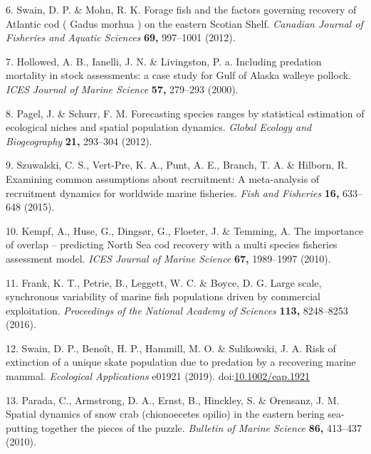 \documentclass[11pt,]{article}
\begin{document}
\leavevmode\hypertarget{ref-Swain2012}{}%
6. Swain, D. P. \& Mohn, R. K. Forage fish and the factors governing recovery of Atlantic cod ( Gadus morhua ) on the eastern Scotian Shelf. \emph{Canadian Journal of Fisheries and Aquatic Sciences} \textbf{69,} 997--1001 (2012).

\leavevmode\hypertarget{ref-Hollowed2000a}{}%
7. Hollowed, A. B., Ianelli, J. N. \& Livingston, P. a. Including predation mortality in stock assessments: a case study for Gulf of Alaska walleye pollock. \emph{ICES Journal of Marine Science} \textbf{57,} 279--293 (2000).

\leavevmode\hypertarget{ref-Pagel2012}{}%
8. Pagel, J. \& Schurr, F. M. Forecasting species ranges by statistical estimation of ecological niches and spatial population dynamics. \emph{Global Ecology and Biogeography} \textbf{21,} 293--304 (2012).

\leavevmode\hypertarget{ref-Szuwalski2015}{}%
9. Szuwalski, C. S., Vert-Pre, K. A., Punt, A. E., Branch, T. A. \& Hilborn, R. Examining common assumptions about recruitment: A meta-analysis of recruitment dynamics for worldwide marine fisheries. \emph{Fish and Fisheries} \textbf{16,} 633--648 (2015).

\leavevmode\hypertarget{ref-Kempf2010}{}%
10. Kempf, A., Huse, G., Dingsør, G., Floeter, J. \& Temming, A. The importance of overlap -- predicting North Sea cod recovery with a multi species fisheries assessment model. \emph{ICES Journal of Marine Science} \textbf{67,} 1989--1997 (2010).

\leavevmode\hypertarget{ref-Frank2016}{}%
11. Frank, K. T., Petrie, B., Leggett, W. C. \& Boyce, D. G. Large scale, synchronous variability of marine fish populations driven by commercial exploitation. \emph{Proceedings of the National Academy of Sciences} \textbf{113,} 8248--8253 (2016).

\leavevmode\hypertarget{ref-Swain2019}{}%
12. Swain, D. P., Benoît, H. P., Hammill, M. O. \& Sulikowski, J. A. Risk of extinction of a unique skate population due to predation by a recovering marine mammal. \emph{Ecological Applications} e01921 (2019). doi:\href{https://doi.org/10.1002/eap.1921}{10.1002/eap.1921}

\leavevmode\hypertarget{ref-Parada2010}{}%
13. Parada, C., Armstrong, D. A., Ernst, B., Hinckley, S. \& Orensanz, J. M. Spatial dynamics of snow crab (chionoecetes opilio) in the eastern bering sea-putting together the pieces of the puzzle. \emph{Bulletin of Marine Science} \textbf{86,} 413--437 (2010).
\end{document}
